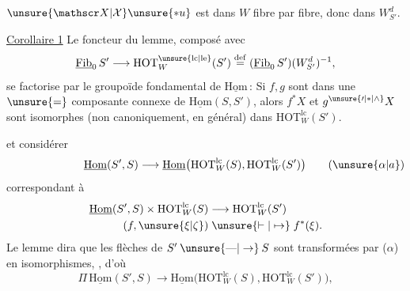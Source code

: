 
$\unsure{\mathscr X|\mathcal X}\unsure{*u}$ est dans $W$ fibre par fibre, donc dans $W_{S'}^d$.

\uline{Corollaire 1} Le foncteur du lemme, composé avec
\[
\underline{\mathrm{Fib}}_0\,S'\longrightarrow\mathrm{HOT}_W^{\unsure{\mathrm{lc}|\mathrm{le}}}(S')
\overset{\mathrm{def}}{=}(\underline{\mathrm{Fib}}_0\,S')(W_{S'}^d)^{-1},
\]
se factorise par le groupoïde fondamental de $\underline{\mathrm{Hom}}$\,:
Si $f,g$ sont dans une $\unsure{=}$ composante connexe de $\underline{\mathrm{Hom}}(S,S')$, alors $f^*X$ et $g^{\unsure{\prime|*|\wedge}}X$ sont isomorphes  (non canoniquement, en général) dans $\mathrm{HOT}_W^{\mathrm{lc}}(S')$.

  et  considérer
\[
\underline{\mathrm{Hom}}(S',S)\longrightarrow\underline{\mathrm{Hom}}\bigl(\mathrm{HOT}_W^{\mathrm{lc}}(S),\mathrm{HOT}_W^{\mathrm{lc}}(S')\bigr)\tag*{\makebox[0pt][r]{\makebox[\displaywidth][l]{($\unsure{\alpha|a}$)}}}
\]
correspondant à
\[
\begin{aligned}
\underline{\mathrm{Hom}}(S',S)\times\mathrm{HOT}_W^{\mathrm{lc}}(S)&\longrightarrow\mathrm{HOT}_W^{\mathrm{lc}}(S')\\
(f,\unsure{\xi|\zeta})&\mathrel{\unsure{\vdash|\mapsto}}f^*(\xi).
\end{aligned}
\]
Le lemme dira que les flèches de $S'\mathbin{\unsure{\text{---}|\to}}S$ sont transformées par ($\alpha$) en isomorphismes, , d'où
\[
\Pi\,\underline{\mathrm{Hom}}(S',S)\longrightarrow\underline{\mathrm{Hom}}\bigl(\mathrm{HOT}_W^{\mathrm{lc}}(S),\mathrm{HOT}_W^{\mathrm{lc}}(S')\bigr),
\]

